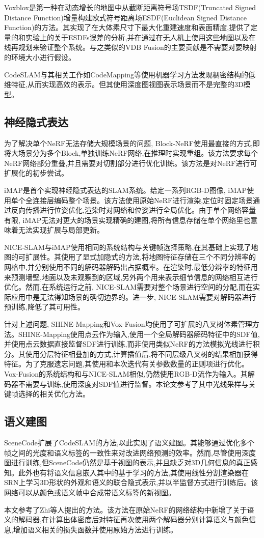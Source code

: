 Voxblox\cite{voxblox}是第一种在动态增长的地图中从截断距离符号场TSDF(Truncated Signed Distance Function)增量构建欧式符号距离场ESDF(Euclidean Signed Distance Function)的方法。其实现了在大体素尺寸下最大化重建速度和表面精度,提供了定量的和实验上的关于ESDFs误差的分析,并在通过在无人机上使用这些地图以及在线再规划来验证整个系统。与之类似的VDB Fusion\cite{vdbfusion}的主要贡献是不需要对要映射的环境大小进行假设。

CodeSLAM\cite{CodeSLAM}与其相关工作如CodeMapping\cite{codemapping}等使用机器学习方法发现稠密结构的低维特征,从而实现高效的表示。但其使用深度图视图表示场景而不是完整的3D模型。
\subsection{神经隐式表达}
为了解决单个NeRF无法存储大规模场景的问题, Block-NeRF\cite{block}使用最直接的方式,即将大场景分为多个Block,单独训练NeRF网络,在推理时实现重组。该方法要求每个NeRF网络部分重叠,并且需要对切割部分进行优化训练。该方法是对NeRF进行可扩展化的初步尝试。

iMAP\cite{imap}是首个实现神经隐式表达的SLAM系统。给定一系列RGB-D图像, iMAP使用单个全连接层编码整个场景。该方法使用原始NeRF进行渲染,定位时固定场景通过反向传播进行位姿优化,渲染时对网络和位姿进行全局优化。由于单个网络容量有限, iMAP无法对更大的场景实现精确的建图,将所有信息存储在单个网络里也意味着无法实现扩展与局部更新。 

NICE-SLAM\cite{nice}与iMAP使用相同的系统结构与关键帧选择策略,在其基础上实现了地图的可扩展性。其使用了显式加隐式的方法,将地图特征存储在三个不同分辨率的网格中,并分别使用不同的解码器解码出占据概率。在渲染时,最低分辨率的特征用来预测墙壁,地面以及未观察到的区域,另外两个用来表示细节信息的网络相互进行优化。然而,在系统运行之前, NICE-SLAM需要对整个场景进行空间的分配,而在实际应用中是无法得知场景的确切边界的。进一步, NICE-SLAM需要对解码器进行预训练,降低了其可用性。

针对上述问题, SHINE-Mapping\cite{shine}和Vox-Fusion\cite{vox}均使用了可扩展的八叉树体素管理方法。SHINE-Mapping使用点云作为输入,使用一个全局解码器解码特征中的SDF值,并使用点云数据直接监督SDF进行训练,而非使用类似NeRF的方法模拟光线进行积分。其使用分层特征相叠加的方式,计算插值后,将不同层级八叉树的结果相加获得特征。为了克服遗忘问题,其使用和本次迭代有关参数数量的正则项进行优化。Vox-Fusion的系统结构和与NICE-SLAM相似,仍然使用RGB-D流作为输入。其解码器不需要与训练,使用深度对SDF值进行监督。本论文参考了其中光线采样与关键帧选择的相关优化方法。

\subsection{语义建图}
SceneCode\cite{scenecode}扩展了CodeSLAM的方法,以此实现了语义建图。其能够通过优化多个帧之间的光度和语义标签的一致性来对改进网络预测的效率。然而,尽管使用深度图进行训练,但SceneCode仍然是基于视图的表示,并且缺乏对3D几何信息的真正感知。此外也有将语义信息嵌入其中的基于学习的方法\cite{semantic2},其使用线性分割渲染器在SRN上学习3D形状的外观和语义的联合隐式表示,并以半监督方式进行训练后。该网络可以从颜色或语义帧中合成带语义标签的新视图。

本文参考了Zhi等人提出的方法\cite{sem_nerf}。该方法在原始NeRF的网络结构中新增了关于语义的解码器,在计算出体密度后对特征再次使用两个解码器分别计算语义与颜色信息,增加语义相关的损失函数并使用原始方法进行训练。